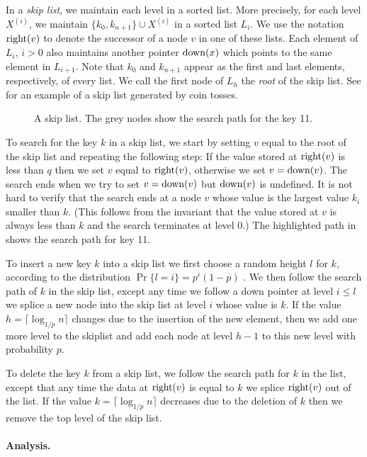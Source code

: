 In a \emph{skip list}, we maintain each level in a sorted list. More
precisely, for each level $X^{(i)}$, we maintain $\{k_0,k_{n+1}\}\cup
X^{(i)}$ in a sorted list $L_i$.  We use the notation $\mathrm{right}(v)$ to
denote the successor of a node $v$ in one of these lists.  Each
element of $L_i$, $i>0$ also maintains another pointer $\mathrm{down}(x)$ which
points to the same element in $L_{i+1}$.  Note that $k_0$ and
$k_{n+1}$ appear as the first and last elements, respectively, of
every list.  We call the first node of $L_h$ the \emph{root} of the
skip list.  See  for an example of a skip list
generated by coin tosses.

\begin{figure}
\caption{A skip list.  The grey nodes show the search path for the key 11.}
\end{figure}

To search for the key $k$ in a skip list, we start by setting $v$
equal to the root of the skip list and repeating the following step:
If the value stored at $\mathrm{right}(v)$ is less than $q$ then we set $v$
equal to $\mathrm{right}(v)$, otherwise we set $v=\mathrm{down}(v)$.  The search ends
when we try to set $v=\mathrm{down}(v)$ but $\mathrm{down}(v)$ is undefined.  It is not
hard to verify that the search ends at a node $v$ whose value is the
largest value $k_i$ smaller than $k$.  (This follows from the
invariant that the value stored at $v$ is always less than $k$ and the
search terminates at level 0.) The highlighted path in
 shows the search path for key 11.

To insert a new key $k$ into a skip list we first choose a random
height $l$ for $k$, according to the distribution $\Pr\{l=i\} =
p^i(1-p)$ .  We then follow the search path of $k$ in the skip list,
except any time we follow a down pointer at level $i\le l$ we splice a
new node into the skip list at level $i$ whose value is $k$.  If the
value $h=\lceil\log_{1/p} n\rceil$ changes due to the insertion of the
new element, then we add one more level to the skiplist and add each
node at level $h-1$ to this new level with probability $p$.

To delete the key $k$ from a skip list, we follow the search path for
$k$ in the list, except that any time the data at $\mathrm{right}(v)$ is equal
to $k$ we splice $\mathrm{right}(v)$ out of the list.  If the value
$k=\lceil\log_{1/p} n\rceil$ decreases due to the deletion of $k$ then
we remove the top level of the skip list.

\paragraph{Analysis.}

